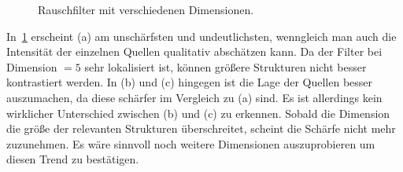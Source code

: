 \documentclass[slug=PET, room=Andreas-Schubert-Bau\,\ 424A, supervisor=Carsten\ Bittrich, coursedate=10.\ 01.\ 2020]{../../Lab_Report_LaTeX/lab_report}
\begin{document}
\begin{figure}[h!]
        \centering
        \caption{Rauschfilter mit verschiedenen Dimensionen.}
        \label{fig:rausch}
\end{figure}

In~\ref{fig:rausch} erscheint (a) am unschärfsten und undeutlichsten,
wenngleich man auch die Intensität der einzelnen Quellen qualitativ
abschätzen kann. Da der Filter bei Dimension \(=5\) sehr lokalisiert
ist, k\"onnen gr\"o\ss{}ere Strukturen nicht besser kontrastiert
werden. In (b) und (c) hingegen ist die Lage der Quellen besser
auszumachen, da diese schärfer im Vergleich zu (a) sind. Es ist
allerdings kein wirklicher Unterschied zwischen (b) und (c) zu
erkennen. Sobald die Dimension die gr\"o\ss{}e der relevanten
Strukturen \"uberschreitet, scheint die Sch\"arfe nicht mehr
zuzunehmen. Es w\"are sinnvoll noch weitere Dimensionen auszuprobieren
um diesen Trend zu best\"atigen.
\end{document}
